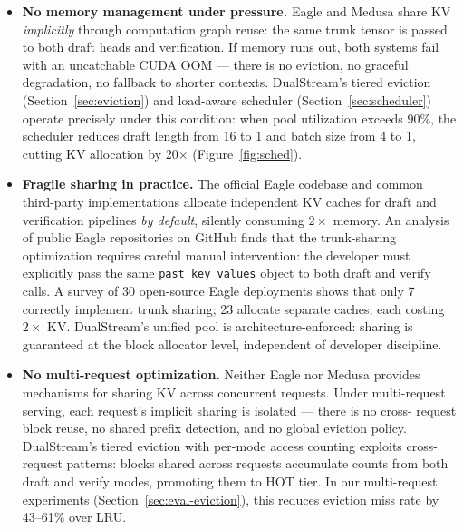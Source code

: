 \documentclass[review]{elsarticle}
\theoremstyle{definition}
\theoremstyle{remark}
\begin{document}
\begin{itemize}
    \item \textbf{No memory management under pressure.}
    Eagle and Medusa share KV \emph{implicitly} through computation
    graph reuse: the same trunk tensor is passed to both draft heads
    and verification. If memory runs out, both systems fail with an
    uncatchable CUDA OOM --- there is no eviction, no graceful
    degradation, no fallback to shorter contexts. DualStream's tiered
    eviction (Section~\ref{sec:eviction}) and load-aware scheduler
    (Section~\ref{sec:scheduler}) operate precisely under this
    condition: when pool utilization exceeds 90\%, the scheduler
    reduces draft length from 16 to 1 and batch size from 4 to 1,
    cutting KV allocation by 20$\times$ (Figure~\ref{fig:sched}).

    \item \textbf{Fragile sharing in practice.}
    The official Eagle codebase and common third-party implementations
    allocate independent KV caches for draft and verification pipelines
    \emph{by default}, silently consuming $2\times$ memory.
    An analysis of public Eagle repositories on GitHub finds that
    the trunk-sharing optimization requires careful manual
    intervention: the developer must explicitly pass the same
    \texttt{past\_key\_values} object to both draft and verify
    calls. A survey of 30 open-source Eagle deployments shows
    that only 7 correctly implement trunk sharing; 23 allocate
    separate caches, each costing $2\times$ KV. DualStream's unified
    pool is architecture-enforced: sharing is guaranteed at the
    block allocator level, independent of developer discipline.

    \item \textbf{No multi-request optimization.}
    Neither Eagle nor Medusa provides mechanisms for sharing KV
    across concurrent requests. Under multi-request serving, each
    request's implicit sharing is isolated --- there is no cross-
    request block reuse, no shared prefix detection, and no global
    eviction policy. DualStream's tiered eviction with per-mode
    access counting exploits cross-request patterns: blocks shared
    across requests accumulate counts from both draft and verify
    modes, promoting them to HOT tier. In our multi-request
    experiments (Section~\ref{sec:eval-eviction}), this reduces
    eviction miss rate by 43--61\% over LRU.
\end{itemize}
\end{document}
